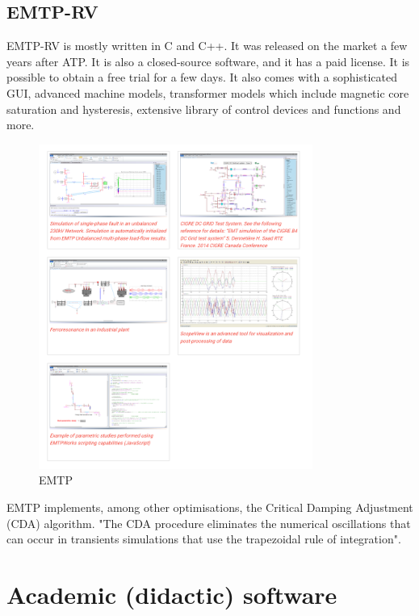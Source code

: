 \subsection{EMTP-RV}

EMTP-RV \cite{emtprv} is mostly written in C and C++. It was released on the market a few years after ATP. It is also a closed-source software, and it has a paid license. It is possible to obtain a free trial for a few days. It also comes with a sophisticated GUI, advanced machine models, transformer models which include magnetic core saturation and hysteresis, extensive library of control devices and functions and more.

\begin{figure}[H]
   \centering
   \includegraphics[width=0.8\textwidth]{img/emtp.png}
   \caption{EMTP}
   \label{emtp}
\end{figure}

EMTP implements, among other optimisations, the Critical Damping Adjustment (CDA) algorithm. "The CDA procedure eliminates the numerical oscillations that can occur in transients simulations that use the trapezoidal rule of integration"\cite{lin1990implementation}.

\section{Academic (didactic) software} \label{etr:academ}

